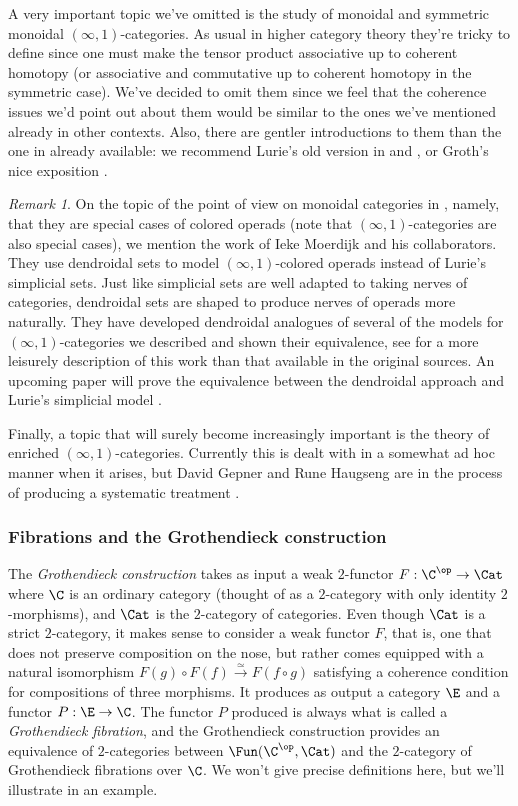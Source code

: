 \documentclass{conm-p-l}
\theoremstyle{definition} \newtheorem{definition}[theorem]{Definition}
\theoremstyle{remark} \newtheorem{remark}[theorem]{Remark}
\numberwithin{equation}{section}
\newcommand{\oo}{\infty}
\newcommand{\io}{$(\oo,1)$}
\begin{document}
A very important topic we've omitted is the study of monoidal and
symmetric monoidal \io-categories. As usual in higher category theory
they're tricky to define since one must make the tensor product
associative up to coherent homotopy (or associative and commutative up
to coherent homotopy in the symmetric case). We've decided to omit
them since we feel that the coherence issues we'd point out about them
would be similar to the ones we've mentioned already in other
contexts. Also, there are gentler introductions to them than the one
in \cite{HA} already available: we recommend Lurie's old version in
\cite{DAG2} and \cite{DAG3}, or Groth's nice exposition \cite[Sections
3 and 4]{Groth}.

\begin{remark}
  On the topic of the point of view on monoidal categories in
  \cite{HA}, namely, that they are special cases of colored operads
  (note that \io-categories are also special cases), we mention the
  work of Ieke Moerdijk and his collaborators. They use dendroidal
  sets to model \io-colored operads instead of Lurie's simplicial
  sets. Just like simplicial sets are well adapted to taking nerves of
  categories, dendroidal sets are shaped to produce nerves of operads
  more naturally. They have developed dendroidal analogues of several
  of the models for $(\oo,1)$-categories we described and shown their
  equivalence, see \cite{Ieke} for a more leisurely description of this
  work than that available in the original sources.
  An upcoming paper will prove the equivalence between the dendroidal
  approach and Lurie's simplicial model \cite{Gijs}.
\end{remark}

Finally, a topic that will surely become increasingly important is the
theory of enriched \io-categories. Currently this is dealt with in a
somewhat ad hoc manner when it arises, but David Gepner and Rune
Haugseng are in the process of producing a systematic treatment
\cite{Rune}.


\subsubsection{Fibrations and the Grothendieck construction}

The \emph{Grothendieck construction} takes as input a weak $2$-functor
$F : \C^{\op} \to \Cat$ where $\C$ is an ordinary category (thought of
as a $2$-category with only identity $2$-morphisms), and $\Cat$  is
the $2$-category of categories. Even though $\Cat$ is a strict
$2$-category, it makes sense to consider a weak functor $F$, that is,
one that does not preserve composition on the nose, but rather comes
equipped with a natural isomorphism $F(g) \circ F(f)
\xrightarrow{\simeq} F(f \circ g)$ satisfying a coherence condition
for compositions of three morphisms. It produces as output a category
$\E$ and a functor $P : \E \to \C$. The functor $P$ produced is always
what is called a \emph{Grothendieck fibration}, and the Grothendieck
construction provides an equivalence of $2$-categories between
$\Fun(\C^{\op}, \Cat)$ and the $2$-category of Grothendieck fibrations
over $\C$. We won't give precise definitions here, but we'll
illustrate in an example.
\end{document}
